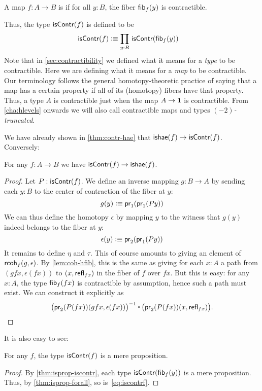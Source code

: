\begin{defn} \label{defn:equivalence}
  A map $f:A\to B$ is 
  if for all $y:B$, the fiber ${\mathsf{fib}}_{f}(y)$ is contractible.
\end{defn}

Thus, the type $\mathsf{isContr}(f)$ is defined to be
\begin{align}
  \iscontr(f) &\defeq \prd{y:B} \iscontr(\hfib f y)\label{eq:iscontrf}
\end{align}
Note that in \cref{sec:contractibility} we defined what it means for a \emph{type} to be contractible.
Here we are defining what it means for a \emph{map} to be contractible.
Our terminology follows the general homotopy-theoretic practice of saying that a map has a certain property if all of its (homotopy) fibers have that property.
Thus, a type $A$ is contractible just when the map $A\to\mathbf{1}$ is contractible.
From \cref{cha:hlevels} onwards we will also call contractible maps and types \emph{$(-2)$-truncated}.

We have already shown in \cref{thm:contr-hae} that $\mathsf{ishae}(f) \to \mathsf{isContr}(f)$.
Conversely:

\begin{thm}\label{thm:lequiv-contr-hae}
For any $f:A\to B$ we have ${\mathsf{isContr}(f)} \to {\ensuremath{\mathsf{ishae}}(f)}$.
\end{thm}
\begin{proof}
Let $P : \mathsf{isContr}(f)$. We define an inverse mapping $g : B \to A$ by sending each $y : B$ to the center of contraction of the fiber at $y$:
\[ g(y) \vcentcolon\equiv \mathsf{pr}_{1}(\mathsf{pr}_{1}(Py)) \]
We can thus define the homotopy $\epsilon$ by mapping $y$ to the witness that $g(y)$ indeed belongs to the fiber at $y$:
\[ \epsilon(y) \vcentcolon\equiv \mathsf{pr}_{2}(\mathsf{pr}_{1}(P y)) \]
It remains to define $\eta$ and $\tau$. This of course amounts to giving an element of $\mathsf{rcoh}_{f}(g,\epsilon)$. By \cref{lem:coh-hfib}, this is the same as giving for each $x:A$ a path from $(gfx,\epsilon(fx))$ to $(x,\mathsf{refl}_{fx})$ in the fiber of $f$ over $fx$. But this is easy: for any $x : A$, the type ${\mathsf{fib}}_{f}(fx)$
is contractible by assumption, hence such a path must exist. We can construct it explicitly as
\[\opp{\big(\proj{2}(P(fx))(gfx,\epsilon(fx))\big)} \ct \big(\proj{2}(P(fx)) (x,\refl{fx})\big). \qedhere \]
\end{proof}

It is also easy to see:

\begin{lem}\label{thm:contr-hprop}
  For any $f$, the type $\mathsf{isContr}(f)$ is a mere proposition.
\end{lem}
\begin{proof}
  By \cref{thm:isprop-iscontr}, each type $\mathsf{isContr} ({\mathsf{fib}}_{f}(y))$ is a mere proposition.
  Thus, by \cref{thm:isprop-forall}, so is~\eqref{eq:iscontrf}.
\end{proof}

